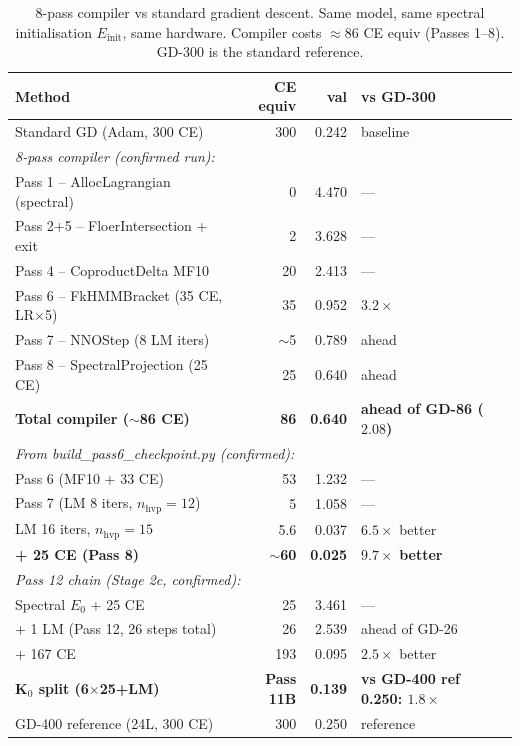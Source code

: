 \documentclass[11pt]{amsart}
\begin{document}
\begin{table}[htbp]
\centering\small
\caption{8-pass compiler vs standard gradient descent.
  Same model, same spectral initialisation $E_\mathrm{init}$, same hardware.
  Compiler costs $\approx 86$ CE equiv (Passes 1--8).
  GD-300 is the standard reference.}
\label{tab:benchmark}
\begin{tabular}{lrrl}
\toprule
\textbf{Method} & \textbf{CE equiv} & \textbf{val} & \textbf{vs GD-300} \\
\midrule
Standard GD (Adam, 300 CE)            & 300 & 0.242 & baseline \\
\midrule
\multicolumn{4}{l}{\textit{8-pass compiler (confirmed run):}} \\
Pass 1 -- AllocLagrangian (spectral)  &   0 & 4.470 & --- \\
Pass 2+5 -- FloerIntersection + exit  &   2 & 3.628 & --- \\
Pass 4 -- CoproductDelta MF10         &  20 & 2.413 & --- \\
Pass 6 -- FkHMMBracket (35 CE, LR$\times$5) & 35 & 0.952 & $3.2\times$ \\
Pass 7 -- NNOStep (8 LM iters)        & $\sim$5 & 0.789 & ahead \\
Pass 8 -- SpectralProjection (25 CE)  &  25 & 0.640 & ahead \\
\textbf{Total compiler ($\sim$86 CE)} & \textbf{86} & \textbf{0.640}
  & \textbf{ahead of GD-86 ($2.08$)} \\
\midrule
\multicolumn{4}{l}{\textit{From build\_pass6\_checkpoint.py (confirmed):}} \\
Pass 6 (MF10 + 33 CE)                & 53  & 1.232 & --- \\
Pass 7 (LM 8 iters, $n_\text{hvp}=12$) & 5 & 1.058 & --- \\
LM 16 iters, $n_\text{hvp}=15$       & 5.6 & 0.037 & $6.5\times$ better \\
\textbf{+ 25 CE (Pass 8)}            & \textbf{$\sim$60} & \textbf{0.025}
  & $\mathbf{9.7\times}$\textbf{ better} \\
\midrule
\multicolumn{4}{l}{\textit{Pass 12 chain (Stage 2c, confirmed):}} \\
Spectral $E_0$ + 25 CE                &  25 & 3.461 & --- \\
+ 1 LM (Pass 12, 26 steps total)      &  26 & 2.539 & ahead of GD-26 \\
+ 167 CE                              & 193 & 0.095 & $2.5\times$ better \\
\textbf{K$_0$ split (6$\times$25+LM)} & \textbf{Pass 11B} & \textbf{0.139}
  & \textbf{vs GD-400 ref 0.250: $1.8\times$} \\
GD-400 reference (24L, 300 CE)        & 300 & 0.250 & reference \\
\bottomrule
\end{tabular}
\end{table}
\end{document}

